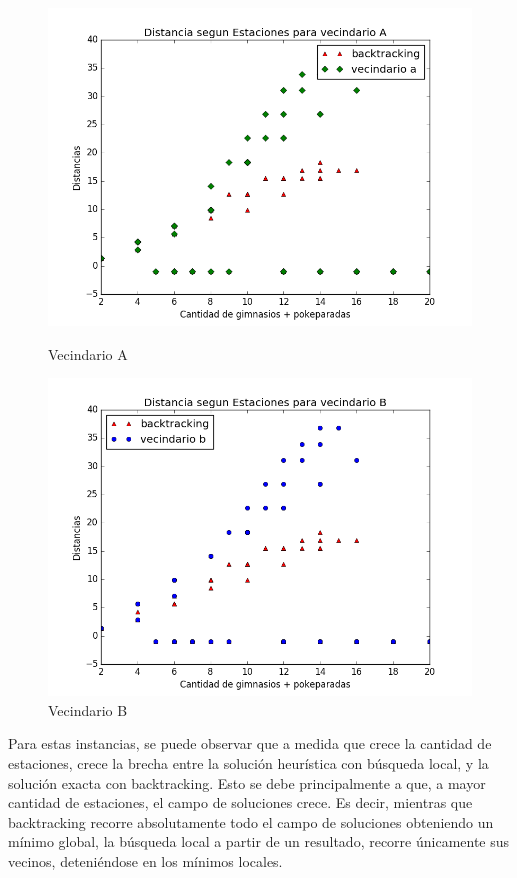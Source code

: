 \begin{figure}[H]
  \includegraphics[width=\linewidth]{imagenes/Exp2Ej3A.png}
  \caption{Vecindario A}
\endminipage\hfill
{}%
  \includegraphics[width=\linewidth]{imagenes/Exp2Ej3B.png}
  \caption{Vecindario B}
\endminipage
\end{figure}

\blindtext

Para estas instancias, se puede observar que a medida que crece la cantidad de estaciones, crece la brecha entre la solución heurística con búsqueda local, y la solución exacta con backtracking. Esto se debe principalmente a que, a mayor cantidad de estaciones, el campo de soluciones crece. Es decir, mientras que backtracking recorre absolutamente todo el campo de soluciones obteniendo un mínimo global, la búsqueda local a partir de un resultado, recorre únicamente sus vecinos, deteniéndose en los mínimos locales. 

